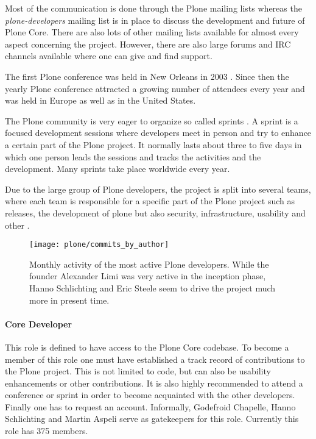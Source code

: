 Most of the communication is done through the Plone mailing lists whereas the
\emph{plone-developers} mailing list is in place to discuss the development and
future of Plone Core. There are also lots of other mailing lists available for
almost every aspect concerning the project. However, there are also large
forums and \ac{IRC} channels available where one can give and find support.

The first Plone conference was held in New Orleans in 2003
\cite{PloneConferences}. Since then the yearly Plone conference attracted a
growing number of attendees every year and was held in Europe as well as in the
United States.

The Plone community is very eager to organize so called sprints
\cite{PloneSprints}. A sprint is a focused development sessions where
developers meet in person and try to enhance a certain part of the Plone
project. It normally lasts about three to five days in which one person leads
the sessions and tracks the activities and the development. Many sprints take
place worldwide every year.

Due to the large group of Plone developers, the project is split into several
teams, where each team is responsible for a specific part of the Plone project
such as releases, the development of plone but also security, infrastructure,
usability and other
\cite{PloneFounders,PloneReleaseManagers,PloneFrameworkTeam,PloneContribute}.

\begin{figure}[thbp]
  \centering
  \texttt{[image: plone/commits\_by\_author]}
  \caption[Commits by Most Active Authors, Plone]
  {Monthly activity of the most active Plone developers. While the founder
    Alexander Limi was very active in the inception phase, Hanno Schlichting
    and Eric Steele seem to drive the project much more in present time.}
  \label{fig:plone:cba}
\end{figure}

\paragraph{Core Developer}

This role is defined to have access to the Plone Core codebase. To become a
member of this role one must have established a track record of contributions
to the Plone project. This is not limited to code, but can also be usability
enhancements or other contributions. It is also highly recommended to attend a
conference or sprint in order to become acquainted with the other developers.
Finally one has to request an account. Informally, Godefroid Chapelle, Hanno
Schlichting and Martin Aspeli serve as gatekeepers for this role. Currently
this role has 375 members.

